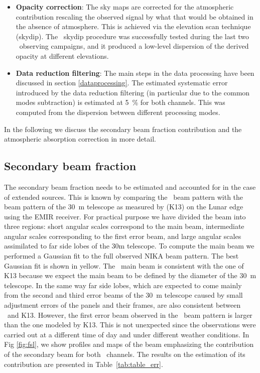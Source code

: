 \begin{itemize}
\item {\bfseries Opacity correction}: The sky maps are
  corrected for the atmospheric contribution rescaling the observed signal by
  what that would be obtained in the absence of atmosphere. This
  is achieved via the elevation scan technique (skydip). The \NIKA\ skydip
  procedure was successfully tested during the last two \NIKA\ observing
  campaigns, and it produced a low-level dispersion of the derived opacity at
  different elevations.

\item {\bfseries Data reduction filtering}: 
The main steps in the data processing 
have been discussed in section \ref{dataprocessing}. The estimated systematic error 
introduced by the data reduction filtering (in particular due to the common modes subtraction) 
is estimated at 5~\% for both channels. This was computed from the dispersion between different
processing modes.

\end{itemize}

In the following we discuss the secondary beam fraction
contribution and the atmospheric absorption correction in more detail.

\subsection{Secondary beam fraction}
The secondary beam fraction needs to be estimated and accounted for in the case of extended sources. 
This is known by comparing the \NIKA\ beam pattern with the beam pattern of the 30~m telescope as measured by \cite{kramer} (K13) on the Lunar edge using the EMIR receiver. For practical purpose we have divided the beam into three regions: short angular scales correspond to the main beam, intermediate angular scales corresponding to the first error beam, and large angular scales assimilated to far side lobes of the 30m telescope. To compute the main beam we performed a Gaussian fit to the full observed NIKA beam pattern. The best Gaussian fit is shown in yellow. The \NIKA\ main beam is consistent with the one of K13 because we expect the main beam to be defined by the diameter of the 30~m telescope. In the same way far side lobes, which are expected to come mainly from the second and third error beams of the 30~m telescope caused by small adjustment errors of the panels and their frames, are also consistent between \NIKA\ and K13. However, the first error beam observed in the \NIKA\ beam pattern is larger than the one modeled by K13. This is not unexpected since the observations were carried out at a different time of day and under different weather conditions.
In Fig \ref{fig:fsl}, we show profiles and maps of the beam emphasizing the contribution of the secondary beam for both \NIKA\ channels. The results on the estimation of its contribution are presented in Table~\ref{tab:table_err}.

